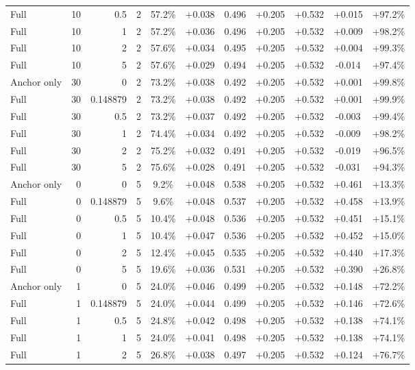 \begin{table}[htbp]
\begin{tabular}{lrrrccccccc}
Full & 10 & 0.5 & 2 & 57.2\% & +0.038 & 0.496 & +0.205 & +0.532 & +0.015 & +97.2\% \\
Full & 10 & 1 & 2 & 57.2\% & +0.036 & 0.496 & +0.205 & +0.532 & +0.009 & +98.2\% \\
Full & 10 & 2 & 2 & 57.6\% & +0.034 & 0.495 & +0.205 & +0.532 & +0.004 & +99.3\% \\
Full & 10 & 5 & 2 & 57.6\% & +0.029 & 0.494 & +0.205 & +0.532 & -0.014 & +97.4\% \\
Anchor only & 30 & 0 & 2 & 73.2\% & +0.038 & 0.492 & +0.205 & +0.532 & +0.001 & +99.8\% \\
Full & 30 & 0.148879 & 2 & 73.2\% & +0.038 & 0.492 & +0.205 & +0.532 & +0.001 & +99.9\% \\
Full & 30 & 0.5 & 2 & 73.2\% & +0.037 & 0.492 & +0.205 & +0.532 & -0.003 & +99.4\% \\
Full & 30 & 1 & 2 & 74.4\% & +0.034 & 0.492 & +0.205 & +0.532 & -0.009 & +98.2\% \\
Full & 30 & 2 & 2 & 75.2\% & +0.032 & 0.491 & +0.205 & +0.532 & -0.019 & +96.5\% \\
Full & 30 & 5 & 2 & 75.6\% & +0.028 & 0.491 & +0.205 & +0.532 & -0.031 & +94.3\% \\
Anchor only & 0 & 0 & 5 & 9.2\% & +0.048 & 0.538 & +0.205 & +0.532 & +0.461 & +13.3\% \\
Full & 0 & 0.148879 & 5 & 9.6\% & +0.048 & 0.537 & +0.205 & +0.532 & +0.458 & +13.9\% \\
Full & 0 & 0.5 & 5 & 10.4\% & +0.048 & 0.536 & +0.205 & +0.532 & +0.451 & +15.1\% \\
Full & 0 & 1 & 5 & 10.4\% & +0.047 & 0.536 & +0.205 & +0.532 & +0.452 & +15.0\% \\
Full & 0 & 2 & 5 & 12.4\% & +0.045 & 0.535 & +0.205 & +0.532 & +0.440 & +17.3\% \\
Full & 0 & 5 & 5 & 19.6\% & +0.036 & 0.531 & +0.205 & +0.532 & +0.390 & +26.8\% \\
Anchor only & 1 & 0 & 5 & 24.0\% & +0.046 & 0.499 & +0.205 & +0.532 & +0.148 & +72.2\% \\
Full & 1 & 0.148879 & 5 & 24.0\% & +0.044 & 0.499 & +0.205 & +0.532 & +0.146 & +72.6\% \\
Full & 1 & 0.5 & 5 & 24.8\% & +0.042 & 0.498 & +0.205 & +0.532 & +0.138 & +74.1\% \\
Full & 1 & 1 & 5 & 24.0\% & +0.041 & 0.498 & +0.205 & +0.532 & +0.138 & +74.1\% \\
Full & 1 & 2 & 5 & 26.8\% & +0.038 & 0.497 & +0.205 & +0.532 & +0.124 & +76.7\% \\

\end{tabular}
\end{table}
